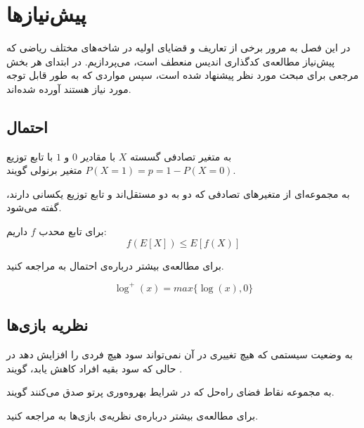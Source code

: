 \chapter{پیش‌نیازها}
\label{chapter:preliminaries}
در این فصل به مرور برخی از تعاریف و قضایای اولیه در شاخه‌های مختلف ریاضی که پیش‌نیاز مطالعه‌ی کدگذاری اندیس منعطف است، می‌پردازیم. در ابتدای هر بخش مرجعی برای مبحث مورد نظر پیشنهاد شده است، سپس مواردی که به طور قابل توجه‌ مورد نیاز هستند آورده شده‌اند.

\section{احتمال}
\begin{definition}
	به متغیر تصادفی گسسته
	$X$
	با مقادیر
	$0$
	و
	$1$
	با تابع توزیع
	$P(X = 1) = p = 1 - P(X = 0)$
	متغیر برنولی گویند.
\end{definition}
\begin{definition}
به مجموعه‌ای از متغیرهای تصادفی که دو به دو مستقل‌‌اند و تابع توزیع یکسانی دارند، گفته می‌شود.
\end{definition}
\begin{theorem}
	\label{Jensen}
	برای تابع محدب
	$f$
	داریم:
	$$f(E[X]) \leq E[f(X)]$$
	
	برای مطالعه‌ی بیشتر درباره‌ی احتمال به
	\cite{book:pro}
	مراجعه کنید.
\end{theorem}

$$\log^{+}(x) = max\{\log(x), 0\}$$
\section{نظریه بازی‌ها}
\begin{definition}
	\label{def:Pareto}
	به وضعیت سیستمی که هیچ تغییری در آن نمی‌تواند سود هیچ فردی را افزایش دهد
	در حالی که سود بقیه افراد کاهش یابد، گویند
	\cite{wiki:pareto}.
	
	\label{def:Pareto-boundary}
	به مجموعه نقاط فضای راه‌حل که در شرایط بهروه‌وری پرتو صدق می‌کنند گویند.
\end{definition}

	برای مطالعه‌ی بیشتر درباره‌ی نظریه‌ی بازی‌ها به
\cite{book:game}
مراجعه کنید.
